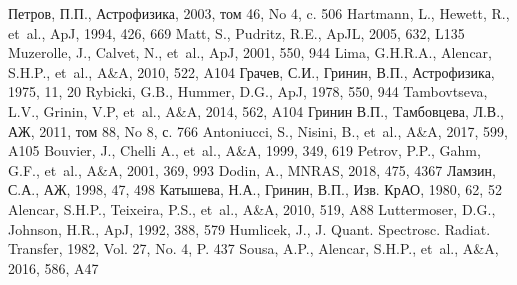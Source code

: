 \documentclass[12pt]{article}
\def\etal{{et~al.}}
\begin{document}
\begin{thebibliography}{99}






 Петров, П.П., Астрофизика, 2003, том 46, No 4, c. 506
 Hartmann, L., Hewett, R., \etal, ApJ, 1994, 426, 669
 Matt, S., Pudritz, R.E., ApJL, 2005, 632, L135
 Muzerolle, J., Calvet, N., \etal, ApJ, 2001, 550, 944
 Lima, G.H.R.A., Alencar, S.H.P., \etal, A\&A, 2010, 522, A104
 Грачев, С.И., Гринин, В.П., Астрофизика, 1975, 11, 20 
 Rybicki, G.B., Hummer, D.G., ApJ, 1978, 550, 944
 Tambovtseva, L.V., Grinin, V.P, \etal, A\&A, 2014, 562, A104
 Гринин В.П., Tамбовцева, Л.В., АЖ, 2011, том 88, No 8, с. 766
 Antoniucci, S., Nisini, B., \etal, A\&A, 2017, 599, A105
 Bouvier, J., Chelli A., \etal, A\&A, 1999, 349, 619
 Petrov, P.P., Gahm, G.F., \etal, A\&A, 2001, 369, 993
 Dodin, A., MNRAS, 2018, 475, 4367
 Ламзин, С.А., АЖ, 1998, 47, 498
 Катышева, Н.А., Гринин, В.П., Изв. КрАО, 1980, 62, 52
 Alencar, S.H.P., Teixeira, P.S., \etal, A\&A, 2010, 519, A88 
 Luttermoser, D.G., Johnson, H.R., ApJ, 1992, 388, 579
 Humlicek, J., J. Quant. Spectrosc. Radiat. Transfer, 1982, Vol. 27, No. 4, P. 437 
 Sousa, A.P., Alencar, S.H.P., \etal, A\&A, 2016, 586, A47

\end{thebibliography}
\end{document}
